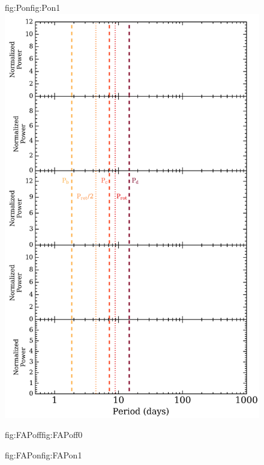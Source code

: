\begin{figure}
\begin{ocg}{fig:Pon}{fig:Pon}{1}
    \includegraphics[width=0.8\hsize]{figures/periodograms_Ps.png}%
  \end{ocg}
  \hspace{-0.8\hsize}%
  \begin{ocg}{fig:FAPoff}{fig:FAPoff}{0}%
  \end{ocg}%
  \begin{ocg}{fig:FAPon}{fig:FAPon}{1}%

\end{ocg}
\end{figure}
